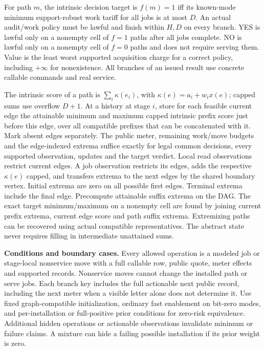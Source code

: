For path \(m\), the intrinsic decision target is \(f(m)=1\) iff its known-mode minimum support-robust work tariff for all jobs is at most \(D\). An actual audit/work policy must be lawful and finish within \(H,D\) on every branch. YES is lawful only on a nonempty cell of \(f=1\) paths after all jobs complete. NO is lawful only on a nonempty cell of \(f=0\) paths and does not require serving them. Value is the least worst supported acquisition charge for a correct policy, including \(+\infty\) for nonexistence. All branches of an issued result use concrete callable commands and real service.

\begin{theorem}\label{ext:t30cg1}\label{ext:t30cg}\label{ext:t30g}

The intrinsic score of a path is \(\sum_i \kappa(e_i)\), with \(\kappa(e)=a_i+w_i x(e)\); capped sums use overflow \(D+1\). At a history at stage \(i\), store for each feasible current edge the attainable minimum and maximum capped intrinsic prefix score just before this edge, over all compatible prefixes that can be concatenated with it. Mark absent edges separately. The public meter, remaining work/move budgets and the edge-indexed extrema suffice exactly for legal common decisions, every supported observation, updates and the target verdict. Local read observations restrict current edges. A job observation restricts its edges, adds the respective \(\kappa(e)\) capped, and transfers extrema to the next edges by the shared boundary vertex. Initial extrema are zero on all possible first edges. Terminal extrema include the final edge. Precompute attainable suffix extrema on the DAG. The exact target minimum/maximum on a nonempty cell are found by joining current prefix extrema, current edge score and path suffix extrema. Extremizing paths can be recovered using actual compatible representatives. The abstract state never requires filling in intermediate unattained sums.

\textbf{Conditions and boundary cases.} Every allowed operation is a modeled job or stage-local nonservice move with a full callable row, public quote, meter effects and supported records. Nonservice moves cannot change the installed path or serve jobs. Each branch key includes the full actionable next public record, including the next meter when a visible letter alone does not determine it. Use fixed graph-compatible initialization, ordinary fast enablement on bit-zero modes, and per-installation or full-positive prior conditions for zero-risk equivalence. Additional hidden operations or actionable observations invalidate minimum or failure claims. A mixture can hide a failing possible installation if its prior weight is zero.


\end{theorem}
